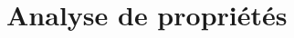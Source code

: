 \documentclass[compress]{beamer}
\begin{document}


\section{Analyse de propriétés}
\begin{frame}
\tableofcontents[hideothersubsections]
\end{frame}
\end{document}
